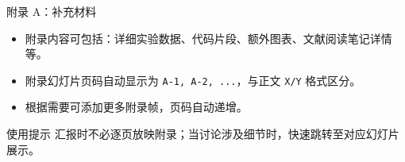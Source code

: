 \documentclass[aspectratio=169]{beamer}
\begin{document}
\begin{frame}{附录 A：补充材料}
  \begin{itemize}
    \item 附录内容可包括：详细实验数据、代码片段、额外图表、文献阅读笔记详情等。
    \item 附录幻灯片页码自动显示为 \texttt{A-1, A-2, ...}，与正文 \texttt{X/Y} 格式区分。
    \item 根据需要可添加更多附录帧，页码自动递增。
  \end{itemize}

  \vspace{1em}
  \begin{block}{使用提示}
    汇报时不必逐页放映附录；当讨论涉及细节时，快速跳转至对应幻灯片展示。
  \end{block}
\end{frame}


\end{document}
